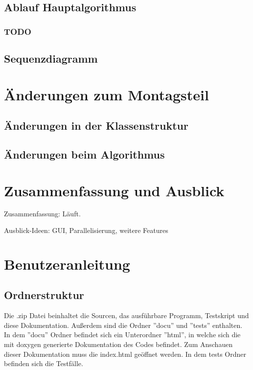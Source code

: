 \documentclass[a4paper,11pt]{article}
\begin{document}
{\subsection{Ablauf Hauptalgorithmus}

\subsubsection{TODO}

\subsection{Sequenzdiagramm}

\section{\"Anderungen zum Montagsteil}

\subsection{\"Anderungen in der Klassenstruktur}

\subsection{\"Anderungen beim Algorithmus}

\section{Zusammenfassung und Ausblick}


Zusammenfassung: Läuft.

Ausblick-Ideen: GUI, Parallelisierung, weitere Features


\section{Benutzeranleitung}
\subsection{Ordnerstruktur}
Die .zip Datei beinhaltet die Sourcen, das ausf\"uhrbare Programm, Testskript und diese Dokumentation. Außerdem sind die Ordner ''docu'' und ''tests'' enthalten. In dem ''docu'' Ordner befindet sich ein Unterordner ''html'', in welche sich die mit doxygen generierte Dokumentation des Codes befindet. Zum Anschauen dieser Dokumentation muss die index.html ge\"offnet werden. In dem tests Ordner befinden sich die Testf\"alle.
}
\end{document}
